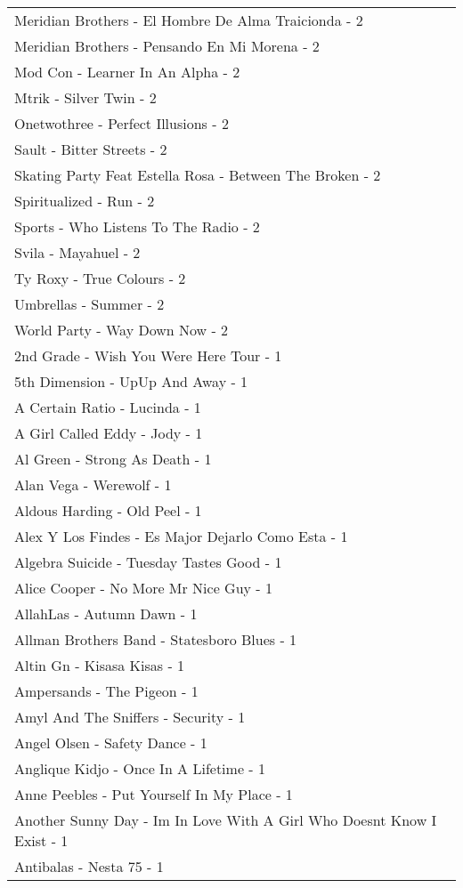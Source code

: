 \documentclass[
]{article}
\begin{document}
\begin{longtable}{l}
Meridian Brothers - El Hombre De Alma Traicionda - 2 \\ 
Meridian Brothers - Pensando En Mi Morena - 2 \\ 
Mod Con - Learner In An Alpha - 2 \\ 
Mtrik - Silver Twin - 2 \\ 
Onetwothree - Perfect Illusions - 2 \\ 
Sault - Bitter Streets - 2 \\ 
Skating Party Feat Estella Rosa - Between The Broken - 2 \\ 
Spiritualized - Run - 2 \\ 
Sports - Who Listens To The Radio - 2 \\ 
Svila - Mayahuel - 2 \\ 
Ty Roxy - True Colours - 2 \\ 
Umbrellas - Summer - 2 \\ 
World Party - Way Down Now - 2 \\ 
2nd Grade - Wish You Were Here Tour - 1 \\ 
5th Dimension - UpUp And Away - 1 \\ 
A Certain Ratio - Lucinda - 1 \\ 
A Girl Called Eddy - Jody - 1 \\ 
Al Green - Strong As Death - 1 \\ 
Alan Vega - Werewolf - 1 \\ 
Aldous Harding - Old Peel - 1 \\ 
Alex Y Los Findes - Es Major Dejarlo Como Esta - 1 \\ 
Algebra Suicide - Tuesday Tastes Good - 1 \\ 
Alice Cooper - No More Mr Nice Guy - 1 \\ 
AllahLas - Autumn Dawn - 1 \\ 
Allman Brothers Band - Statesboro Blues - 1 \\ 
Altin Gn - Kisasa Kisas - 1 \\ 
Ampersands - The Pigeon - 1 \\ 
Amyl And The Sniffers - Security - 1 \\ 
Angel Olsen - Safety Dance - 1 \\ 
Anglique Kidjo - Once In A Lifetime - 1 \\ 
Anne Peebles - Put Yourself In My Place - 1 \\ 
Another Sunny Day - Im In Love With A Girl Who Doesnt Know I Exist - 1 \\ 
Antibalas - Nesta 75 - 1 \\ 

\end{longtable}
\end{document}
